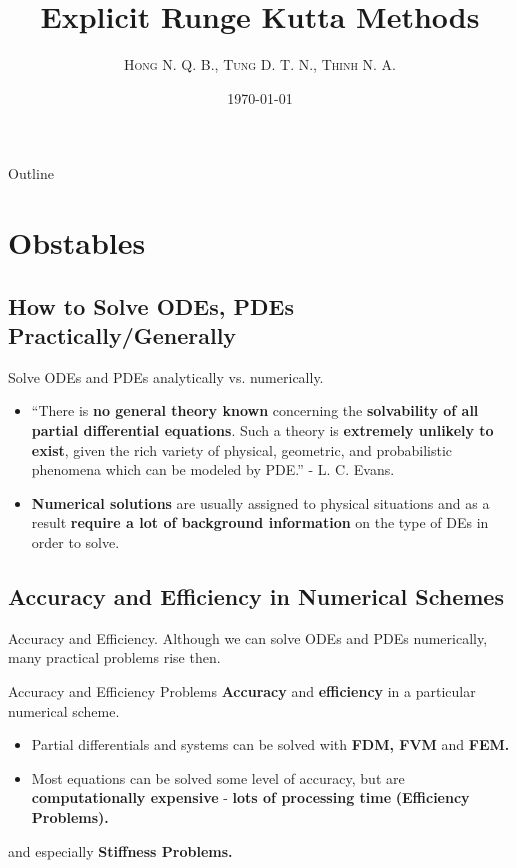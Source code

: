 \documentclass[9pt]{beamer}
\title[Seminar Math Modelling]{\Huge Explicit Runge Kutta Methods}
\author{\textsc{Hong N. Q. B.},  \textsc{Tung D. T. N.}, \textsc{Thinh N. A.} }
\date{\today}
\numberwithin{equation}{section}
\begin{document}
\begin{frame}
  \titlepage
\end{frame}
\begin{frame}{Outline}
  \tableofcontents
\end{frame}
\section{Obstables}
\subsection{How to Solve ODEs, PDEs Practically/Generally}
\begin{frame}{Solve ODEs and PDEs analytically vs. numerically.}
\begin{itemize}
\item ``There is \textbf{no general theory known} concerning the \textbf{solvability of all partial differential equations}. Such a theory is \textbf{extremely unlikely to exist}, given the rich variety of physical, geometric, and probabilistic  phenomena which can be modeled by PDE.'' - L. C. Evans.
\vspace{0.2cm}
\item \textbf{Numerical solutions} are usually assigned to physical situations and as a result \textbf{require a lot of background information} on the type of DEs in order to solve.
\end{itemize}
\end{frame}


\subsection{Accuracy and Efficiency in Numerical Schemes}
\begin{frame}{Accuracy and Efficiency.}
Although we can solve ODEs and PDEs numerically, many practical problems rise then.
\begin{block}{Accuracy and Efficiency Problems}
\textbf{Accuracy} and \textbf{efficiency} in a particular numerical scheme.
\begin{itemize}
\item Partial differentials and systems can be solved with \textbf{FDM, FVM} and \textbf{FEM.}
\vspace{0.2cm}
\item Most equations can be solved some level of accuracy, but are \textbf{computationally expensive} - \textbf{lots of processing time} \textbf{(Efficiency Problems).}
\end{itemize}
\end{block}
and especially \textbf{Stiffness Problems.}

\end{frame}
\end{document}
